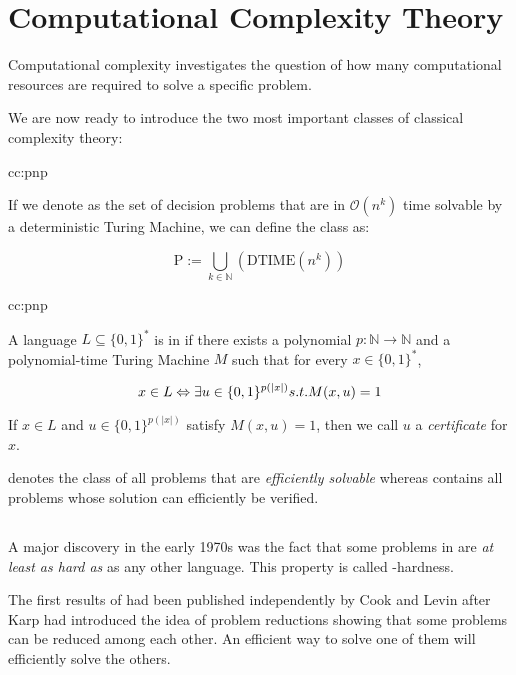 \section{Computational Complexity Theory}

Computational complexity investigates the question of how many computational resources are required to solve a specific problem. 


We are now ready to introduce the two most important classes of classical complexity theory:

\begin{cc}{cc:pnp}

    If we denote \DTIME as the set of decision problems that are in $\mathcal{O}(n^k)$ time solvable by a deterministic Turing Machine, we can define the class \Pt as:

    \[ \mathrm{P} := \bigcup_{k \in \mathbb{N}}(\mathrm{DTIME}(n^k))\]

\end{cc}

\begin{cc}{cc:pnp}

    A language $L \subseteq \{0,1\}^*$ is in \Pt if there exists a polynomial $p: \mathbb{N} \rightarrow \mathbb{N}$ and a polynomial-time Turing Machine $M$ such that for every $x \in \{0,1\}^*$,

    \[ x \in L \Leftrightarrow \exists u \in \{0,1\}^{p(|x|)} \mathnormal{s.t.} M(x,u) = 1 \]

    \noindent If $x \in L$ and $u \in \{ 0,1 \}^{p(|x|)}$ satisfy $M(x,u) = 1$, then we call $u$  a \textit{certificate} for $x$.
\end{cc}

\Pt denotes the class of all problems that are \textit{efficiently solvable} whereas \NP contains all problems whose solution can efficiently be verified.

\subsection{\NPcn}
A major discovery in the early 1970s was the fact that some problems in \NP are \textit{at least as hard as} as any other language.
This property is called \NP-hardness.

The first results of \NPcn had been published independently by Cook \cite{Cook1971} and Levin \cite{Levin1973} after Karp \cite{Karp1972} had introduced the idea of problem reductions showing that some problems can be reduced among each other.
An efficient way to solve one of them will efficiently solve the others. 

